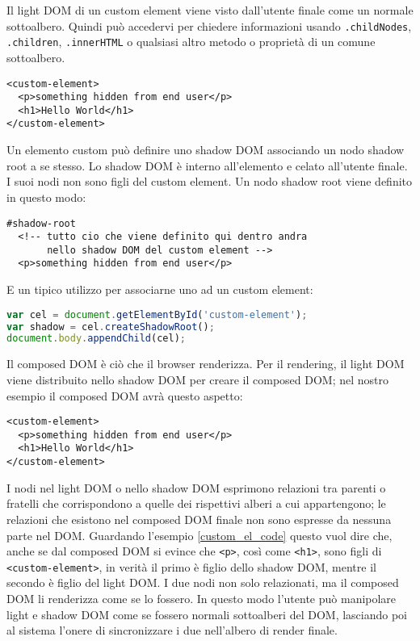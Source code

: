 Il light DOM di un custom element viene visto dall’utente finale come un normale sottoalbero. Quindi può accedervi per chiedere informazioni usando \texttt{.childNodes}, \texttt{.children}, \texttt{.innerHTML} o qualsiasi altro metodo o proprietà di un comune sottoalbero.
\begin{lstlisting}[language=HTML5]
<custom-element>
  <p>something hidden from end user</p>
  <h1>Hello World</h1>
</custom-element>
\end{lstlisting}
Un elemento custom può definire uno shadow DOM associando un nodo shadow root a se stesso. Lo shadow DOM è interno all’elemento e celato all’utente finale. I suoi nodi non sono figli del custom element. Un nodo shadow root viene definito in questo modo:
\begin{lstlisting}[language=HTML5]
#shadow-root
  <!-- tutto cio che viene definito qui dentro andra
  	   nello shadow DOM del custom element -->
  <p>something hidden from end user</p>
\end{lstlisting}
E un tipico utilizzo per associarne uno ad un custom element:
\begin{lstlisting}[language=JavaScript]
var cel = document.getElementById('custom-element');
var shadow = cel.createShadowRoot();
document.body.appendChild(cel);
\end{lstlisting}
Il composed DOM è ciò che il browser renderizza. Per il rendering, il light DOM viene distribuito nello shadow DOM per creare il composed DOM; nel nostro esempio il composed DOM avrà questo aspetto:
\begin{lstlisting}[language=HTML5,label={custom_el_code}]
<custom-element>
  <p>something hidden from end user</p>
  <h1>Hello World</h1>
</custom-element>
\end{lstlisting}
I nodi nel light DOM o nello shadow DOM esprimono relazioni tra parenti o fratelli che corrispondono a quelle dei rispettivi alberi a cui appartengono; le relazioni che esistono nel composed DOM finale non sono espresse da nessuna parte nel DOM. Guardando l’esempio \ref{custom_el_code} questo vuol dire che, anche se dal composed DOM si evince che \texttt{<p>}, così come \texttt{<h1>}, sono figli di \texttt{<custom-element>}, in verità il primo è figlio dello shadow DOM, mentre il secondo è figlio del light DOM. I due nodi non solo relazionati, ma il composed DOM li renderizza come se lo fossero. In questo modo l’utente può manipolare light e shadow DOM come se fossero normali sottoalberi del DOM, lasciando poi al sistema l’onere di sincronizzare i due nell’albero di render finale.

